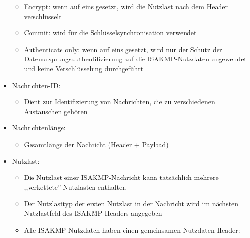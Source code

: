 \documentclass[a4paper]{article}
\begin{document}
\begin{multicols}{3}
\begin{itemize}
              \begin{itemize}
                  \item
                        Encrypt: wenn auf eins gesetzt, wird die Nutzlast nach dem Header
                        verschlüsselt
                  \item
                        Commit: wird für die Schlüsselsynchronisation verwendet
                  \item
                        Authenticate only: wenn auf eins gesetzt, wird nur der Schutz der
                        Datenursprungsauthentifizierung auf die ISAKMP-Nutzdaten angewendet
                        und keine Verschlüsselung durchgeführt
              \end{itemize}
        \item
              Nachrichten-ID:

              \begin{itemize}
                  \item
                        Dient zur Identifizierung von Nachrichten, die zu verschiedenen
                        Austauschen gehören
              \end{itemize}
        \item
              Nachrichtenlänge:

              \begin{itemize}
                  \item
                        Gesamtlänge der Nachricht (Header + Payload)
              \end{itemize}
        \item
              Nutzlast:

              \begin{itemize}
                  \item
                        Die Nutzlast einer ISAKMP-Nachricht kann tatsächlich mehrere
                        ,,verkettete'' Nutzlasten enthalten
                  \item
                        Der Nutzlasttyp der ersten Nutzlast in der Nachricht wird im
                        nächsten Nutzlastfeld des ISAKMP-Headers angegeben
                  \item
                        Alle ISAKMP-Nutzdaten haben einen gemeinsamen Nutzdaten-Header:


\end{itemize}
\end{itemize}
\end{multicols}
\end{document}
